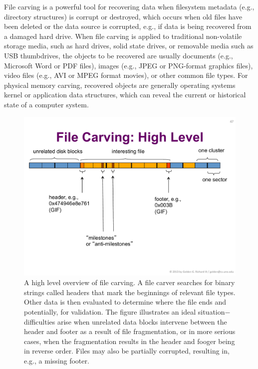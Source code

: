 File carving is a powerful tool for recovering data when filesystem
metadata (e.g., directory structures) is corrupt or destroyed, which
occurs when old files have been deleted or the data source is
corrupted, e.g., if data is being recovered from a damaged hard drive.
When file carving is applied to traditional non-volatile storage
media, such as hard drives, solid state drives, or removable media
such as USB thumbdrives, the objects to be recovered are usually
documents (e.g., Microsoft Word or PDF files), images (e.g., JPEG or
PNG-format graphics files), video files (e.g., AVI or MPEG format
movies), or other common file types.  For physical memory carving,
recovered objects are generally operating systems kernel or
application data structures, which can reveal the current or
historical state of a computer system.


\begin{figure}[ht]
\begin{center}
\includegraphics[width=140mm]{ch-carving/carvingoverview.pdf}
\end{center}
\caption{A high level overview of file carving.  A file carver
  searches for binary strings called headers that mark the beginnings
  of relevant file types.  Other data is then evaluated to determine
  where the file ends and potentially, for validation.  The figure
  illustrates an ideal situation$-$difficulties arise when unrelated
  data blocks intervene between the header and footer as a result of
  file fragmentation, or in more serious cases, when the fragmentation
  results in the header and fooger being in reverse order.  Files may
  also be partially corrupted, resulting in, e.g., a missing footer.}
\label{fig:carvingoverview}
\end{figure}

